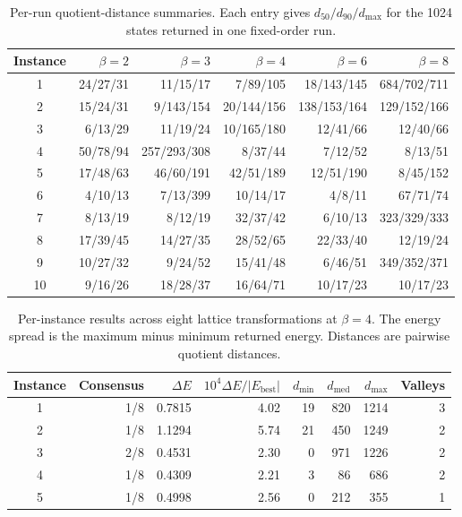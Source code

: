 \begin{table}[htbp]
\scriptsize
\centering
\caption{Per-run quotient-distance summaries. Each entry gives
$d_{50}/d_{90}/d_{\max}$ for the 1024 states returned in one fixed-order run.}
\label{tab:supp-diversity-runs}
\begin{tabular}{@{}crrrrr@{}}
\toprule
Instance & $\beta=2$ & $\beta=3$ & $\beta=4$ & $\beta=6$ & $\beta=8$ \\
\midrule
1  & 24/27/31 & 11/15/17 & 7/89/105 & 18/143/145 & 684/702/711 \\
2  & 15/24/31 & 9/143/154 & 20/144/156 & 138/153/164 & 129/152/166 \\
3  & 6/13/29 & 11/19/24 & 10/165/180 & 12/41/66 & 12/40/66 \\
4  & 50/78/94 & 257/293/308 & 8/37/44 & 7/12/52 & 8/13/51 \\
5  & 17/48/63 & 46/60/191 & 42/51/189 & 12/51/190 & 8/45/152 \\
6  & 4/10/13 & 7/13/399 & 10/14/17 & 4/8/11 & 67/71/74 \\
7  & 8/13/19 & 8/12/19 & 32/37/42 & 6/10/13 & 323/329/333 \\
8  & 17/39/45 & 14/27/35 & 28/52/65 & 22/33/40 & 12/19/24 \\
9  & 10/27/32 & 9/24/52 & 15/41/48 & 6/46/51 & 349/352/371 \\
10 & 9/16/26 & 18/28/37 & 16/64/71 & 10/17/23 & 10/17/23 \\
\bottomrule
\end{tabular}
\end{table}

\begin{table}[htbp]
\small
\centering
\caption{Per-instance results across eight lattice transformations at
$\beta=4$. The energy spread is the maximum minus minimum returned energy.
Distances are pairwise quotient distances.}
\label{tab:supp-transform-diversity}
\begin{tabular}{@{}crrrrrrr@{}}
\toprule
Instance & Consensus & $\Delta E$ &
$10^4\Delta E/|E_{\mathrm{best}}|$ &
$d_{\min}$ & $d_{\mathrm{med}}$ & $d_{\max}$ & Valleys \\
\midrule
1 & 1/8 & 0.7815 & 4.02 & 19 & 820 & 1214 & 3 \\
2 & 1/8 & 1.1294 & 5.74 & 21 & 450 & 1249 & 2 \\
3 & 2/8 & 0.4531 & 2.30 & 0  & 971 & 1226 & 2 \\
4 & 1/8 & 0.4309 & 2.21 & 3  & 86  & 686  & 2 \\
5 & 1/8 & 0.4998 & 2.56 & 0  & 212 & 355  & 1 \\
\bottomrule
\end{tabular}
\end{table}
\FloatBarrier

